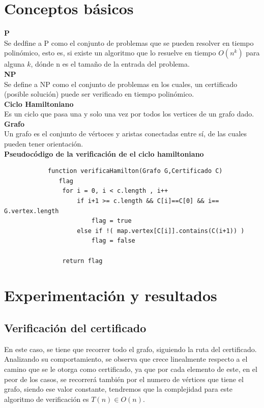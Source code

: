 \documentclass{article}
\begin{document}
  
   \newpage
\section{Conceptos básicos}
    \textbf{P}\\
    Se dedfine a P como el conjunto de problemas que se pueden resolver en tiempo polinómico, esto es, si existe un algoritmo que lo resuelve en tiempo $O(n^{k})$ para alguna $k$, dónde n es el tamaño de la entrada del problema.\cite{1}\\
    \textbf{NP}\\
    Se define a NP como el conjunto de problemas en los cuales, un certificado (posible solución) puede ser verificado en tiempo polinómico.\cite{1}\\
    \textbf{Ciclo Hamiltoniano}\\
    Es un ciclo que pasa una y solo una vez por todos los vertices de un grafo dado.\cite{2}\\
    \textbf{Grafo}\\
    Un grafo es el conjunto de vértoces y aristas conectadas entre sí, de las cuales pueden tener orientación.\cite{3}\\

  
 
    \textbf{Pseudocódigo de la verificación de el ciclo hamiltoniano}
        \begin{verbatim}
            function verificaHamilton(Grafo G,Certificado C)
               flag
                for i = 0, i < c.length , i++
                    if i+1 >= c.length && C[i]==C[0] && i== G.vertex.length
                        flag = true
                    else if !( map.vertex[C[i]].contains(C(i+1)) )
                        flag = false
                        
                return flag
        \end{verbatim}
        \newpage
\section{Experimentación y resultados}
    \subsection{Verificación del certificado}
    En este caso, se tiene que recorrer todo el grafo, siguiendo la ruta del certificado. Analizando su comportamiento, se observa que crece linealmente respecto a el camino que se le otorga como certificado, ya que por cada elemento de este, en el peor de los casos, se recorrerá también por el numero de vértices que tiene el grafo, siendo ese valor constante, tendremos que la complejidad para este algoritmo de verificación es $T(n) \in O(n)$. 
    
\end{document}
